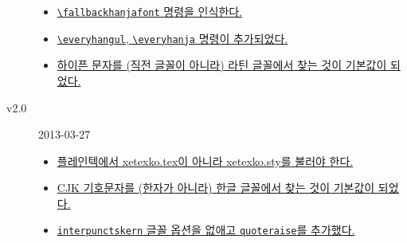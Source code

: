 \documentclass[a4paper]{article}
\def\cs#1{\texttt{\textbackslash #1}}
\def\hparen#1{{\small\hangulparens(#1)}}
\begin{document}
\begin{small}
\begin{description}
\begin{itemize}
        \item \hyperref[sec:fontcmds]
          {\cs{fallbackhanjafont} 명령을 인식한다.}
        \item \hyperref[sec:etccmds]
          {\cs{everyhangul}, \cs{everyhanja} 명령이 추가되었다.}
        \item \hyperref[sec:symbolfont]
          {하이픈 문자를 \hparen{직전 글꼴이 아니라} 라틴 글꼴에서 찾는
          것이 기본값이 되었다.}
      \end{itemize}
    \item[v2.0] 2013-03-27
      \begin{itemize}
        \item \hyperref[sec:loading]
          {플레인텍에서 xetexko.tex이 아니라 xetexko.sty를 불러야 한다.}
        \item \hyperref[sec:symbolfont]
          {CJK 기호문자를 \hparen{한자가 아니라} 한글 글꼴에서 찾는 것이
          기본값이 되었다.}
        \item \hyperref[sec:fontopts]
          {\texttt{interpunctskern} 글꼴 옵션을 없애고 \texttt{quoteraise}를
          추가했다.}
      \end{itemize}
  \end{description}
\end{small}
\end{document}
